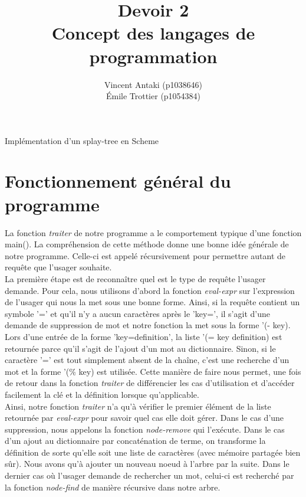 \documentclass[french]{article}
\title{Devoir 2 \\
    Concept des langages de programmation}
\author{Vincent Antaki (p1038646)\\
		Émile Trottier (p1054384)}
\begin{document}
	\maketitle
	
	\abstract
	    Implémentation d'un splay-tree en Scheme
    	
	\section{Fonctionnement général du programme}
		La fonction \textit{traiter} de notre programme a le comportement 
		typique d'une fonction main(). La compréhension de cette méthode
		donne une bonne idée générale de notre programme. Celle-ci est appelé 
		récursivement pour permettre autant de 
		requête que l'usager souhaite.\\
		
		La première étape est de reconnaître quel est le type de requête 
		l'usager demande. Pour cela, nous utilisons d'abord
		la fonction \textit{eval-expr} sur l'expression de l'usager qui nous 
		la met sous une bonne forme. Ainsi, si la requête contient un
		symbole '=' et qu'il n'y a aucun caractères après le 'key=', il s'agit d'une demande de suppression de mot et notre fonction
		la met sous la forme '(- key). Lors d'une entrée de la forme 
		'key=definition', la liste '(= key definition) est retournée parce 
		qu'il s'agit de l'ajout d'un mot au dictionnaire. Sinon, si le caractère '=' est tout simplement absent de la chaîne, c'est
		une recherche d'un mot et la forme '(\% key) est utilisée. Cette 
		manière de faire nous permet, une fois de retour dans la fonction 
		\textit{traiter} de différencier les cas d'utilisation et d'accéder 
		facilement la clé et la définition lorsque qu'applicable. \\
		 
			Ainsi, notre fonction \textit{traiter} n'a qu'à vérifier le 
			premier élément de la liste retournée par \textit{eval-expr} pour 
			savoir quel cas elle doit gérer. Dans le cas d'une suppression,
		nous appelons la fonction \textit{node-remove} qui l'exécute. Dans le 
		cas d'un ajout au dictionnaire par concaténation de terme, on 
		transforme la définition de sorte qu'elle soit une liste de caractères 
		(avec mémoire partagée bien sûr).
		Nous avons qu'à ajouter un nouveau noeud à l'arbre par la suite. Dans 
		le dernier cas où l'usager demande de rechercher un mot,
		celui-ci est recherché par la fonction \textit{node-find} de manière 
		récursive dans notre arbre.\\
			
\end{document}
